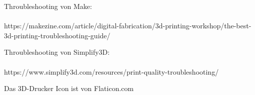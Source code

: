 \documentclass{article}
\begin{document}
	\noindent \begin{minipage}{0.4\textwidth}
		\centering
		Throubleshooting von Make:\\[0.5em]
		\\[0.5em]
		https://makezine.com/article/digital-fabrication/3d-printing-workshop/the-best-3d-printing-troubleshooting-guide/\\
		[0.5em]
	\end{minipage}
	\hfill
	\begin{minipage}{0.4\textwidth}
		\centering
		Throubleshooting von Simplify3D:\\[0.5em]
		\\[0.5em]
		https://www.simplify3d.com/resources/print-quality-troubleshooting/ \\
	\end{minipage}
	\vspace{1em}
	
	\noindent{}
	\vfill
	\begin{center}
		\color{darkgray}
		Das 3D-Drucker Icon ist von Flaticon.com
	\end{center}
	
\end{document}
